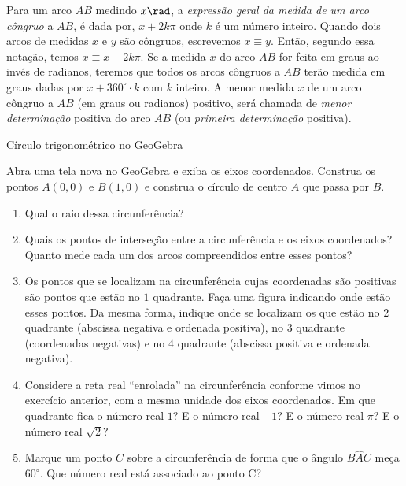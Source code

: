 Para um arco $AB$ medindo $x\rad$, a \textit{expressão geral da medida de um arco côngruo} a $AB$, é dada por, $x+2k\pi$ onde $k$ é um número inteiro. Quando dois arcos de medidas $x$ e $y$ são côngruos, escrevemos $x\equiv y$. Então, segundo essa notação, temos $x\equiv x+2k\pi$. Se a medida $x$ do arco $AB$ for feita em graus ao invés de radianos, teremos que todos os arcos côngruos a $AB$ terão medida em graus dadas por $x+360^{\circ}\cdot k$ com $k$ inteiro. A menor medida $x$ de um arco côngruo a $AB$ (em graus ou radianos) positivo, será chamada de \textit{menor determinação} positiva do arco $AB$ (ou \textit{primeira determinação }positiva).

\label{trig-prac2}

\begin{task}{Círculo trigonométrico no GeoGebra}
\label{trig-ativ12}

Abra uma tela nova no GeoGebra e exiba os eixos coordenados. Construa os pontos $A(0,0)$ e $B(1,0)$ e construa o círculo de centro $A$ que passa por $B$.
\begin{enumerate}
\item Qual o raio dessa circunferência?
\item Quais os pontos de interseção entre a circunferência e os eixos coordenados? Quanto mede cada um dos arcos compreendidos entre esses pontos?
\item Os pontos que se localizam na circunferência cujas coordenadas são positivas são pontos que estão no $1$ quadrante. Faça uma figura indicando onde estão esses pontos. Da mesma forma, indique onde se localizam os que estão no $2$ quadrante (abscissa negativa e ordenada positiva), no $3$ quadrante (coordenadas negativas) e no $4$ quadrante (abscissa positiva e ordenada negativa).
\clearpage

\item Considere a reta real “enrolada”{} na circunferência conforme vimos no exercício anterior, com a mesma unidade dos eixos coordenados. Em que quadrante fica o número real $1$? E o número real $-1$? E o número real $\pi$? E o número real $\sqrt{2}$?
\item Marque um ponto $C$ sobre a circunferência de forma que o ângulo $B\hat{A}C$ meça $60^{\circ}$. Que número real está associado ao ponto C?
\end{enumerate}
\end{task}

